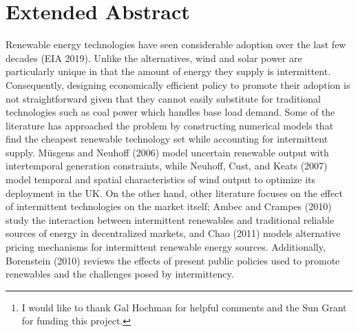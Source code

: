\documentclass[11pt,a4paper]{extarticle}
\begin{document}
\title{}

\author[]{Saketh Aleti\thanks{I would like to thank Gal Hochman for helpful comments and the Sun Grant for funding this project. }}


\date{\vspace{-1em}\small{\today}}

\maketitle

\section{Extended Abstract}

Renewable energy technologies have seen considerable adoption over the last few decades (EIA 2019). Unlike the alternatives, wind and solar power are particularly unique in that the amount of energy they supply is intermittent. Consequently, designing economically efficient policy to promote their adoption is not straightforward given that they cannot easily substitute for traditional technologies such as coal power which handles base load demand. Some of the literature has approached the problem by constructing numerical models that find the cheapest renewable technology set while accounting for intermittent supply. Müsgens and Neuhoff (2006) model uncertain renewable output with intertemporal generation constraints, while Neuhoff, Cust, and Keats (2007) model temporal and spatial characteristics of wind output to optimize its deployment in the UK. On the other hand, other literature focuses on the effect of intermittent technologies on the market itself; Ambec and Crampes (2010) study the interaction between intermittent renewables and traditional reliable sources of energy in decentralized markets, and Chao (2011) models alternative pricing mechanisms for intermittent renewable energy sources. Additionally, Borenstein (2010) reviews the effects of present public policies used to promote renewables and the challenges posed by intermittency. 
\end{document}
